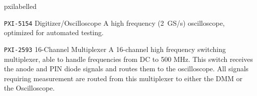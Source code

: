 \begin{labelled}{pxilabelled}
  \item[\pxislotn{6} \texttt{PXI-5154}\hspace{.25em} Digitizer/Oscilloscope]
    A high frequency (2~GS/s) oscilloscope, optimized for automated testing.

  \item[\pxislotn{7} \texttt{PXI-2593}\hspace{.25em} 16-Channel Multiplexer]
    A 16-channel high frequency switching multiplexer, able to handle frequencies from DC to 500 MHz.  This switch receives the anode and PIN diode signals and routes them to the oscilloscope.
    All signals requiring measurement are routed from this multiplexer to either the DMM or the Oscilloscope.

\end{labelled}






